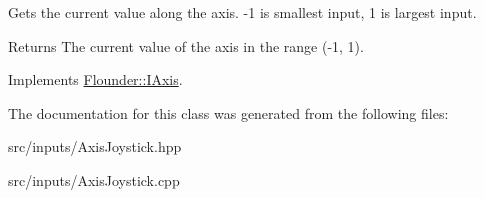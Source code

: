 Gets the current value along the axis. -\/1 is smallest input, 1 is largest input. 

\begin{DoxyReturn}{Returns}
The current value of the axis in the range (-\/1, 1). 
\end{DoxyReturn}


Implements \hyperlink{class_flounder_1_1_i_axis_a5107db92879be3e2ea56841baea993b3}{Flounder\+::\+I\+Axis}.



The documentation for this class was generated from the following files\+:\begin{DoxyCompactItemize}
\item 
src/inputs/Axis\+Joystick.\+hpp\item 
src/inputs/Axis\+Joystick.\+cpp\end{DoxyCompactItemize}
